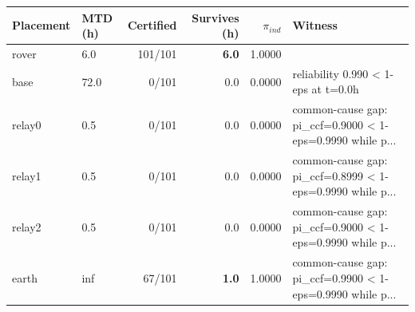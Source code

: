 \begin{tabular}{@{}llrrrl@{}}
\toprule
\textbf{Placement} & \textbf{MTD (h)} & \textbf{Certified} & \textbf{Survives (h)} & $\pi_{ind}$ & \textbf{Witness}\\
\midrule
rover & 6.0 & 101/101 & \textbf{6.0} & 1.0000 & \\
base & 72.0 & 0/101 & 0.0 & 0.0000 & reliability 0.990 < 1-eps at t=0.0h\\
relay0 & 0.5 & 0/101 & 0.0 & 0.0000 & common-cause gap: pi\_ccf=0.9000 < 1-eps=0.9990 while p...\\
relay1 & 0.5 & 0/101 & 0.0 & 0.0000 & common-cause gap: pi\_ccf=0.8999 < 1-eps=0.9990 while p...\\
relay2 & 0.5 & 0/101 & 0.0 & 0.0000 & common-cause gap: pi\_ccf=0.9000 < 1-eps=0.9990 while p...\\
earth & inf & 67/101 & \textbf{1.0} & 1.0000 & common-cause gap: pi\_ccf=0.9900 < 1-eps=0.9990 while p...\\
\bottomrule
\end{tabular}
